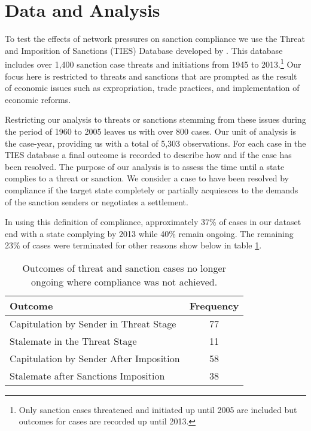 \section*{Data and Analysis}
\label{empirics}

To test the effects of network pressures on sanction compliance we use the Threat and Imposition of Sanctions (TIES) Database developed by \citet{morgan2009threat}. This database includes over 1,400 sanction case threats and initiations from 1945 to 2013.\footnote{Only sanction cases threatened and initiated up until 2005 are included but outcomes for cases are recorded up until 2013.} Our focus here is restricted to threats and sanctions that are prompted as the result of economic issues such as expropriation, trade practices, and implementation of economic reforms. 


Restricting our analysis to threats or sanctions stemming from these issues during the period of 1960 to 2005 leaves us with over 800 cases. Our unit of analysis is the case-year, providing us with a total of 5,303 observations. For each case in the TIES database a final outcome is recorded to describe how and if the case has been resolved. The purpose of our analysis is to assess the time until a state complies to a threat or sanction. We consider a case to have been resolved by compliance if the target state completely or partially acquiesces to the demands of the sanction senders or negotiates a settlement.
	
In using this definition of compliance, approximately 37\% of cases in our dataset end with a state complying by 2013 while 40\% remain ongoing. The remaining 23\% of cases were terminated for other reasons show below in table \ref{tab:termCases}.

\newpage
\begin{table}[ht]
	\centering
	\begin{tabular}{lc}
		\hline\hline
		Outcome & Frequency \\
		\hline
		Capitulation by Sender in Threat Stage & 77 \\
		Stalemate in the Threat Stage & 11 \\		
		Capitulation by Sender After Imposition & 58 \\
		Stalemate after Sanctions Imposition & 38 \\
		\hline\hline
	\end{tabular}
	\caption{Outcomes of threat and sanction cases no longer ongoing where compliance was not achieved.}
	\label{tab:termCases}	
\end{table}
\newpage

